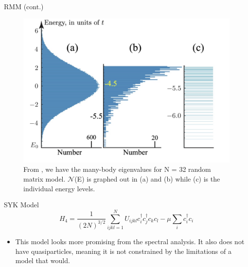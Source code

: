 \documentclass{beamer}
\begin{document}
\begin{frame}{RMM (cont.)}
\begin{figure}
    \centering
    \includegraphics[scale = 0.4]{RandomMatrixSpectrum.jpeg}
    \caption{From \cite{Chowdhury_2022}, we have the many-body eigenvalues for N = 32 random matrix model. $\mathcal{N}$(E) is graphed out in (a) and (b) while (c) is the individual energy levels.}
    \label{fig:enter-label}
\end{figure}
    
\end{frame}
\begin{frame}{SYK Model}
\begin{equation}
    H_{4} = \frac{1}{(2N)^{3/2}} \sum_{ijkl =1}^{N} U_{ijkl} c_{i}^{\dagger}c_{j}^{\dagger}c_{k}c_{l} -  \mu \sum_{i}c_{i}^{\dagger}c_{i}
\end{equation}
\begin{itemize}
    \item This model looks more promising from the spectral analysis. It also does not have quasiparticles, meaning it is not constrained by the limitations of a model that would.
\end{itemize}
\end{frame}
\end{document}
